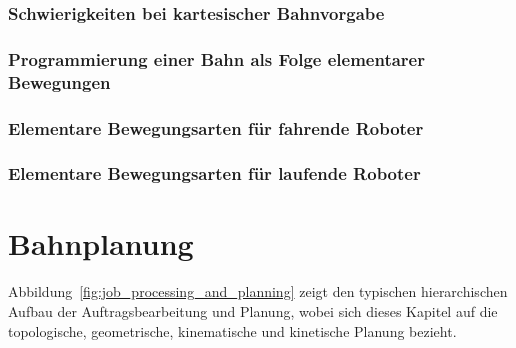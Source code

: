 \documentclass[a4paper, 11pt, accentcolor = tud3b]{tudreport}
\begin{document}
			\subsection{Schwierigkeiten bei kartesischer Bahnvorgabe} %

			\subsection{Programmierung einer Bahn als Folge elementarer Bewegungen} %

			\subsection{Elementare Bewegungsarten für fahrende Roboter} %

			\subsection{Elementare Bewegungsarten für laufende Roboter} %

	\chapter{Bahnplanung}
		Abbildung~\ref{fig:job_processing_and_planning} zeigt den typischen hierarchischen Aufbau der Auftragsbearbeitung und Planung, wobei sich dieses Kapitel auf die topologische, geometrische, kinematische und kinetische Planung bezieht.
		
\end{document}
